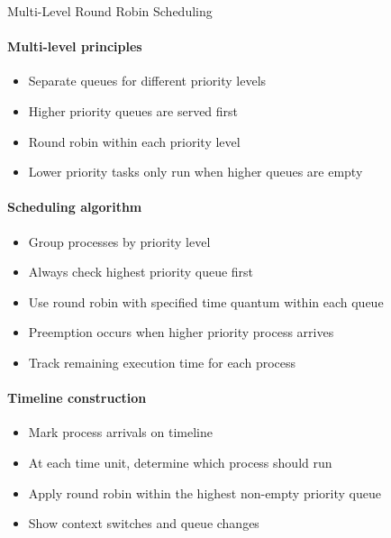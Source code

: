\begin{KR}{Multi-Level Round Robin Scheduling}
    \paragraph{Multi-level principles}
    \begin{itemize}
        \item Separate queues for different priority levels
        \item Higher priority queues are served first
        \item Round robin within each priority level
        \item Lower priority tasks only run when higher queues are empty
    \end{itemize}
    
    \paragraph{Scheduling algorithm}
    \begin{itemize}
        \item Group processes by priority level
        \item Always check highest priority queue first
        \item Use round robin with specified time quantum within each queue
        \item Preemption occurs when higher priority process arrives
        \item Track remaining execution time for each process
    \end{itemize}
    
    \paragraph{Timeline construction}
    \begin{itemize}
        \item Mark process arrivals on timeline
        \item At each time unit, determine which process should run
        \item Apply round robin within the highest non-empty priority queue
        \item Show context switches and queue changes
    \end{itemize}
\end{KR}

